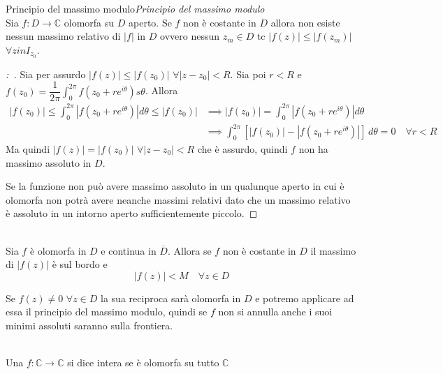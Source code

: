 \documentclass[11pt,a4paper,twoside]{book}
\newenvironment{teorema}[1][\empty]{\begin{Teorema}{
\ifx\empty#1\relax\else\mdseries\itshape#1\\\fi
}{}}{\end{Teorema}}
\newenvironment{definizione}[1][\empty]{\begin{Definizione}{
\ifx\empty#1\relax\else\mdseries\itshape#1\\\fi
}{}}{\end{Definizione}}
\newenvironment{corollario}[1][\empty]{\begin{Corollario}{
\ifx\empty#1\relax\else\mdseries\itshape#1\\\fi
}{}}{\end{Corollario}}
\newenvironment{dimo}[1][\proofname]{
	\begin{tcolorbox}[
	breakable, 
	enhanced, 
	interior hidden, 
	frame hidden, 
	borderline west = {1pt}{0pt}{gray}, 
	top=0pt, bottom=0pt, left=0pt]
\begin{proof}[#1:~]
}
{
\end{proof}
\end{tcolorbox}
}
\theoremstyle{esss}
\theoremstyle{dotless}
\numberwithin{equation}{section} %
\begin{document}
\begin{teorema}[Principio del massimo modulo]
Sia $f:D\rightarrow\mathbb{C}$ olomorfa su $D$ aperto. Se $f$ non è costante in $D$ allora non esiste nessun massimo relativo di $|f|$ in $D$ ovvero nessun $z_m\in D$ tc $|f(z)|\leq|f(z_m)|$ $\forall z in I_{z_0}$. 
\end{teorema}
\begin{dimo}
Sia per assurdo $|f(z)|\leq|f(z_0)|$ $\forall |z-z_0|<R$. Sia poi $r<R$ e $f(z_0)=\dfrac{1}{2\pi} \int_0^{2\pi} f(z_0+re^{i\theta}) s\theta$.
Allora \begin{align*}
|f(z_0)|\leq\int_0^{2\pi} |f(z_0+re^{i\theta})|d\theta\leq|f(z_0)|&\implies |f(z_0)|=\int_0^{2\pi} |f(z_0+re^{i\theta})|d\theta \\ &\implies \int_0^{2\pi} \left[ |f(z_0)|-|f(z_0+re^{i\theta})| \right] \, d\theta=0 \quad \forall r<R
\end{align*}
Ma quindi $|f(z)|=|f(z_0)|$ $\forall |z-z_0|<R$ che è assurdo, quindi $f$ non ha massimo assoluto in $D$.

Se la funzione non può avere massimo assoluto in un qualunque aperto in cui è olomorfa non potrà avere neanche massimi relativi dato che un massimo relativo è assoluto in un intorno aperto sufficientemente piccolo. \qedhere
\end{dimo}

\begin{corollario}
Sia $f$ è olomorfa in $D$ e continua in $\overline{D}$. Allora se $f$ non è costante in $D$ il massimo di $|f(z)|$ è sul bordo e 
\[
|f(z)|<M \quad \forall z\in  D
\]
\end{corollario}

Se $f(z)\neq 0$ $\forall z\in D$ la sua reciproca sarà olomorfa in $D$ e potremo applicare ad essa il principio del massimo modulo, quindi se $f$ non si annulla anche i suoi minimi assoluti saranno sulla frontiera.

\begin{definizione} Una $f:\mathbb{C}\rightarrow\mathbb{C}$ si dice intera se è olomorfa su tutto $\mathbb{C}$
\end{definizione}
\end{document}
